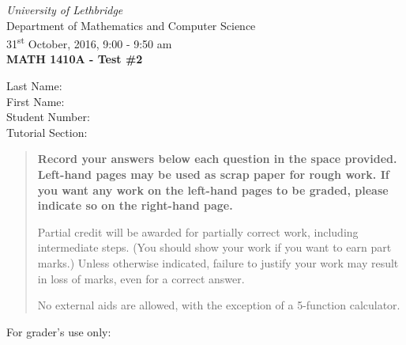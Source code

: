 \documentclass[12pt]{article}
\newcommand{\skipline}{\vspace{12pt}}
\begin{document}
\author{Instructor: Sean Fitzpatrick}
\thispagestyle{plain}
\begin{center}
\emph{University of Lethbridge}\\
Department of Mathematics and Computer Science\\
31\textsuperscript{st} October, 2016, 9:00 - 9:50 am\\
{\bf MATH 1410A - Test \#2}\\
\end{center}
\skipline \skipline \skipline \noindent \skipline
Last Name:\underline{\hspace{353pt}}\\
\skipline
First Name:\underline{\hspace{350pt}}\\
\skipline
Student Number:\underline{\hspace{323pt}}\\
\skipline
Tutorial Section: \underline{\hspace{320pt}}\\


\vspace{0.5in}


\begin{quote}
 {\bf Record your answers below each question in the space provided.    Left-hand pages may be used as scrap paper for rough work.  If you want any work on the left-hand pages to be graded, please indicate so on the right-hand page.
 
 \bigskip
 
Partial credit will be awarded for partially correct work, including intermediate steps. (You should show your work if you want to earn part marks.) Unless otherwise indicated, failure to justify your work may result in loss of marks, even for a correct answer. 

\bigskip

No external aids are allowed, with the exception of a 5-function calculator.}
\end{quote}


\vspace{0.5in}

For grader's use only:
\end{document}
